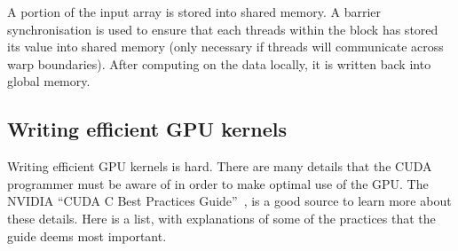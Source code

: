 \documentclass[a4paper]{book}
\begin{document}
\noindent A portion of the input array is stored into shared memory. A 
barrier synchronisation is used to ensure that each threads within the block 
has stored its value into shared memory (only necessary if threads will 
communicate across warp boundaries). After computing on the data locally, 
it is written back into global memory. 


\subsection{Writing efficient GPU kernels} 
\label{sec:efficient}

Writing efficient GPU kernels is hard. There are many details that the CUDA 
programmer must be aware of in order to make optimal use of the GPU. 
The NVIDIA ``CUDA C Best Practices Guide''~\citet{BestPrac}, is a good source 
to learn more about these details. Here is a list, with explanations of some 
of the practices that the guide deems most important. 
\end{document}
